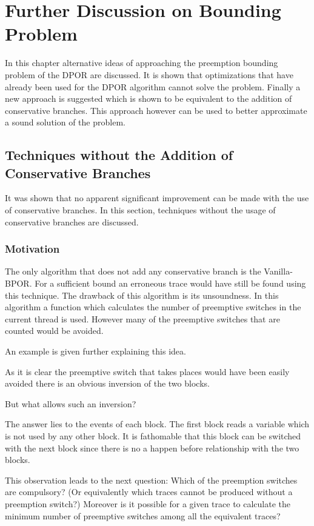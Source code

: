 \chapter{Further Discussion on Bounding Problem}
\label{Chapter 5}

In this chapter alternative ideas of approaching the preemption bounding problem of the DPOR are discussed. It is shown that optimizations that have already been used for the DPOR algorithm cannot solve the problem.
Finally a new approach is suggested which is shown to be equivalent to the addition of conservative branches. This approach however can be used to better approximate
a sound solution of the problem. 

\section{Techniques without the Addition of Conservative Branches}

It was shown that no apparent significant improvement can be made with the use of conservative branches. In this section, techniques without the usage of 
conservative branches are discussed.

\subsection{Motivation}
The only algorithm that does not add any conservative branch is the Vanilla-BPOR. For a sufficient bound an erroneous trace would have still be found using this technique.
The drawback of this algorithm is its unsoundness. In this algorithm a function which calculates the number of preemptive switches in the current thread is used.
However many of the preemptive switches that are counted would be avoided.

An example is given further explaining this idea.


As it is clear the preemptive switch that takes places would have been easily avoided there is an obvious inversion of the two blocks.

But what allows such an inversion?

The answer lies to the events of each block. The first block reads a variable which is not used by any other block. It is fathomable that this block can be switched with the
next block since there is no a happen before relationship with the two blocks.

This observation leads to the next question: Which of the preemption switches are compulsory? (Or equivalently which traces cannot be produced without a preemption switch?)
Moreover is it possible for a given trace to calculate the minimum number of preemptive switches among all the equivalent traces?


